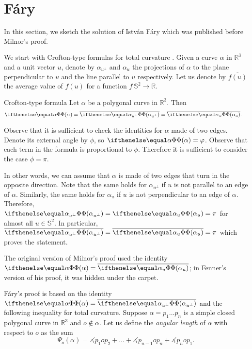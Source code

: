 \section{Fáry}\label{sec:fary}

In this section, we sketch the solution of István Fáry \cite{fary} which was published before Milnor's proof.

We start with Crofton-type formulas for total curvature \cite[Proposition 4.1]{sullivan-curves}.
Given a curve $\alpha$ in $\mathbb{R}^3$ and a unit vector $u$, denote by $\alpha_{u^\perp}$ 
and $\alpha_u$ the projections of $\alpha$ to the plane perpendicular to $u$ and the line parallel to $u$ respectively.
Let us denote by $\overline{f(u)}$ the average value of $f(u)$ for a function $f\:\mathbb{S}^2\to\mathbb{R}$.

\begin{thm}{Crofton-type formula}\label{prop:tc-crofton}
Let $\alpha$ be a polygonal curve in $\mathbb{R}^3$.
Then
\begin{align*}
\tc\alpha
&=\overline{\tc{\alpha_{u^\perp}}}
=\overline{\tc{\alpha_u}}.
\end{align*}
\end{thm}


Observe that it is sufficient to check the identities for $\alpha$ made of two edges.
Denote its external angle by $\phi$, so $\tc\alpha=\phi$.
Observe that each term in the formula is proportional to $\phi$.
Therefore it is sufficient to consider the case $\phi=\pi$.

In other words, we can assume that $\alpha$ is made of two edges that turn in the opposite direction.
Note that the same holds for $\alpha_{u^\perp}$ if $u$ is not parallel to an edge of $\alpha$.
Similarly, the same holds for $\alpha_u$ if $u$ is not perpendicular to an edge of $\alpha$.
Therefore, $\tc{\alpha_{u^\perp}}=\tc{\alpha_u}=\pi$ for almost all $u\in\mathbb{S}^2$.
In particular, $\overline{\tc{\alpha_{u^\perp}}}=\overline{\tc{\alpha_u}}=\pi$ which proves the statement.
\qeds

The original version of Milnor's proof 
used the identity $\tc\alpha=\overline{\tc{\alpha_u}}$;
in Fenner's version of his proof, it was hidden under the carpet.

Fáry's proof is based on the identity $\tc\alpha=\overline{\tc{\alpha_{u^\perp}}}$ and the following inequality for total curvature.
Suppose $\alpha=p_1\dots p_n$ is a simple closed polygonal curve in $\mathbb{R}^3$ and $o\notin\alpha$.
Let us define the \emph{angular length} of $\alpha$ with respect to $o$ as the sum
\[\Psi_o(\alpha)=\measuredangle p_{1} o p_{2}+\dots+\measuredangle p_{n-1} o p_{n}+\measuredangle p_{n} o p_{1}.\]

